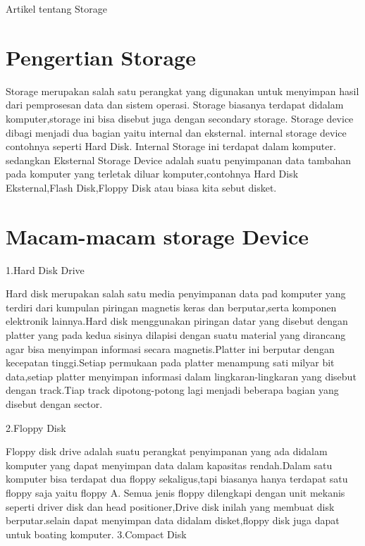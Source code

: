 






Artikel tentang Storage





\section{Pengertian Storage}
Storage merupakan salah satu perangkat yang digunakan untuk menyimpan hasil dari pemprosesan data dan sistem operasi. Storage biasanya terdapat didalam komputer,storage ini bisa disebut juga dengan secondary storage.
Storage device dibagi menjadi dua bagian yaitu internal dan eksternal. internal storage device contohnya seperti Hard Disk. Internal Storage ini terdapat dalam komputer. sedangkan Eksternal Storage Device adalah suatu penyimpanan data tambahan pada komputer yang terletak diluar komputer,contohnya Hard Disk Eksternal,Flash Disk,Floppy Disk atau biasa kita sebut disket.
\section{Macam-macam storage Device}

1.Hard Disk Drive

Hard disk merupakan salah satu media penyimpanan data pad komputer yang terdiri dari kumpulan piringan magnetis keras dan berputar,serta komponen elektronik lainnya.Hard disk menggunakan piringan datar yang disebut dengan platter yang pada kedua sisinya dilapisi dengan suatu material yang dirancang agar bisa menyimpan informasi secara magnetis.Platter ini berputar dengan kecepatan tinggi.Setiap permukaan pada platter menampung sati milyar bit data,setiap platter menyimpan informasi dalam lingkaran-lingkaran yang disebut dengan track.Tiap track dipotong-potong lagi menjadi beberapa bagian yang disebut dengan sector.

2.Floppy Disk

Floppy disk drive adalah suatu perangkat penyimpanan yang ada didalam komputer yang dapat menyimpan data dalam kapasitas rendah.Dalam satu komputer bisa terdapat dua floppy sekaligus,tapi biasanya hanya terdapat satu floppy saja yaitu floppy A. Semua jenis floppy dilengkapi dengan unit mekanis seperti driver disk dan head positioner,Drive disk inilah yang membuat disk berputar.selain dapat menyimpan data didalam disket,floppy disk juga dapat untuk boating komputer.
3.Compact Disk


